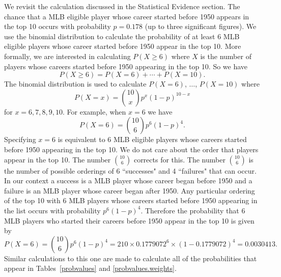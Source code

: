 \documentclass[11pt]{article}\usepackage[]{graphicx}\usepackage[]{color}
\begin{document}
We revisit the calculation discussed in the Statistical Evidence section.  
The chance that a MLB eligible player whose career started before 1950 
appears in the top 10 occurs with probability $p = 0.178$ 
(up to three significant figures).  We use the binomial distribution to 
calculate the probability of at least 6 MLB eligible players whose career 
started before 1950 appear in the top 10.  More formally, we are interested in 
calculating $P(X \geq 6)$ where $X$ is the number of players whose careers 
started before 1950 appearing in the top 10.  So we have
$$  
  P(X \geq 6) = P(X = 6) + \cdots + P(X = 10). 
$$
The binomial distribution is used to calculate $P(X = 6)$, $\ldots$, 
$P(X = 10)$ where
$$  
  P(X = x) = {10 \choose x}p^x(1-p)^{10-x}
$$
for $x = 6,7,8,9,10$. For example, when $x = 6$ we have
$$  
  P(X = 6) = {10 \choose 6}p^6(1-p)^{4}. 
$$
Specifying $x = 6$ is equivalent to 6 MLB eligible players whose careers 
started before 1950 appearing in the top 10.  We do not care about the order 
that players appear in the top 10.  The number ${10 \choose 6}$ corrects for 
this. The number ${10 \choose 6}$ is the number of possible orderings of 6 
``successes" and 4 ``failures" that can occur.  In our context a success is a 
MLB player whose career began before 1950 and a failure is an 
MLB player whose career began after 1950.  Any particular ordering of the top 
10 with 6 MLB players whose careers started before 1950 appearing 
in the list occurs with probability $p^6(1-p)^4$. 
Therefore the probability that 6 MLB players who started their careers  
before 1950 appear in the top 10 is given by
$$  
  P(X = 6) = {10 \choose 6}p^6(1-p)^{4} 
    = 210 \times 0.1779072^6 \times (1 - 0.1779072)^4
    = 0.0030413. 
$$
Similar calculations to this one are made to calculate all of the 
probabilities that appear in Tables~\ref{probvalues} and 
\ref{probvalues.weights}.
\end{document}
